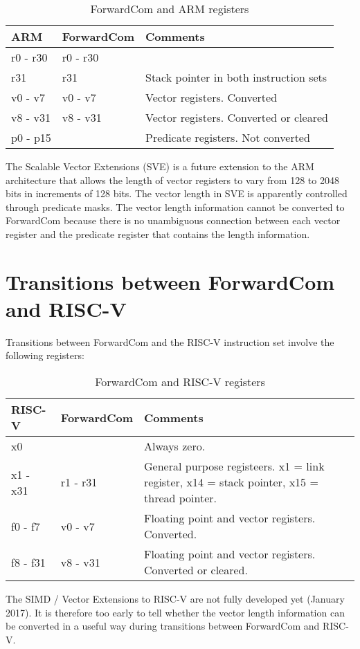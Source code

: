 \documentclass[forwardcom.tex]{subfiles}
\begin{document}
\begin{longtable} {|p{20mm}|p{20mm}|p{80mm}|}
\caption{ForwardCom and ARM registers} 
\label{table:ForwardComAndARMRegisters}
\\
\endfirsthead
\endhead
\hline
\bfseries ARM & \bfseries ForwardCom & \bfseries Comments  \\
\hline
r0 - r30 & r0 - r30 &   \\ 
\hline
r31 & r31 & Stack pointer in both instruction sets \\
\hline
v0 - v7 & v0 - v7 & Vector registers. Converted \\ 
\hline
v8 - v31 & v8 - v31 & Vector registers. Converted or cleared \\
\hline
p0 - p15 &  & Predicate registers. Not converted \\
\hline
\end{longtable}

\vspace{2mm}
The Scalable Vector Extensions (SVE) is a future extension to the ARM architecture that 
allows the length of vector registers to vary from 128 to 2048 bits in increments of 128 bits. The vector length in SVE is apparently controlled through predicate masks. The vector length information cannot be converted to ForwardCom because there is no unambiguous connection between each vector register and the predicate register that contains the length information.

\section{Transitions between ForwardCom and RISC-V}

Transitions between ForwardCom and the RISC-V instruction set involve the following registers:

\begin{longtable} {|p{20mm}|p{20mm}|p{80mm}|}
\caption{ForwardCom and RISC-V registers} 
\label{table:ForwardComAndRISCVRegisters}
\\
\endfirsthead
\endhead
\hline
\bfseries RISC-V & \bfseries ForwardCom & \bfseries Comments  \\
\hline
x0 &  &  Always zero. \\
\hline
x1 - x31 & r1 - r31 & General purpose registeers. x1 = link register,
x14 = stack pointer, x15 = thread pointer. \\
\hline
f0 - f7 & v0 - v7 & Floating point and vector registers. Converted. \\ 
\hline
f8 - f31 & v8 - v31 & Floating point and vector registers. Converted or cleared. \\
\hline
\end{longtable}

\vspace{2mm}
The SIMD / Vector Extensions to RISC-V are not fully developed yet (January 2017). It is therefore too early to tell whether the vector length information can be converted in a useful way during transitions between ForwardCom and RISC-V.
\end{document}
